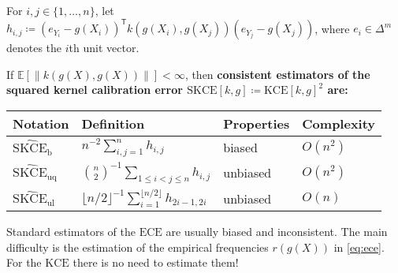 \documentclass[10pt]{article}
\newcommand{\hl}[1]{\begingroup\bfseries\boldmath\color{uured}#1\endgroup}
\newcommand*{\transpose}[1]{{#1}^{\mathsf{T}}}
\newcommand*{\ECE}{\mathup{ECE}}
\newcommand*{\kernelmeasure}{\mathup{KCE}}
\newcommand*{\squaredkernelmeasure}{\mathup{SKCE}}
\newcommand*{\biasedestimator}{\widehat{\mathup{SKCE}}_{\mathup{b}}}
\newcommand*{\unbiasedestimator}{\widehat{\mathup{SKCE}}_{\mathup{uq}}}
\newcommand*{\linearestimator}{\widehat{\mathup{SKCE}}_{\mathup{ul}}}
\begin{document}
\begin{tcbposter}
{    For $i,j \in \{1,\ldots,n\}$, let
    $h_{i,j} \coloneqq \transpose{(e_{Y_i} - g(X_i))} k(g(X_i), g(X_j)) (e_{Y_j} - g(X_j))$,
    where $e_i \in \Delta^m$ denotes the $i$th unit vector.

    \begin{tcolorbox}[colback=blondstark]
      If $\mathbb{E}[\|k(g(X),g(X))\|] < \infty$, then \hl{consistent estimators}
      of the squared kernel calibration error
      $\squaredkernelmeasure[k, g] \coloneqq \kernelmeasure[k,g]^2$ are:
      \begin{center}
        \begin{tabular}{llll} \toprule
          Notation & Definition & Properties & Complexity\\ \midrule
          $\biasedestimator$ & $n^{-2} \sum_{i,j=1}^n h_{i,j}$ & biased & $O(n^2)$ \\
          $\unbiasedestimator$ & $ {\binom{n}{2}}^{-1} \sum_{1 \leq i < j \leq n} h_{i,j}$ & unbiased & $O(n^2)$ \\
          $\linearestimator$ & $ {\lfloor n/2\rfloor}^{-1} \sum_{i = 1}^{\lfloor n / 2\rfloor} h_{2i-1,2i}$ & unbiased & $O(n)$ \\ \bottomrule
        \end{tabular}
      \end{center}
    \end{tcolorbox}


    Standard estimators of the $\ECE$ are usually biased and inconsistent.
    The main difficulty is the estimation of the empirical frequencies
    $r(g(X))$ in \cref{eq:ece}. For the $\kernelmeasure$ there is no need
    to estimate them!
  }


\end{tcbposter}
\end{document}
